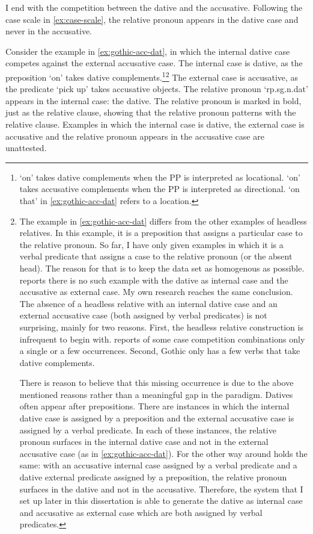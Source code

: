 I end with the competition between the dative and the accusative. Following the case scale in \ref{ex:case-scale}, the relative pronoun appears in the dative case and never in the accusative.

Consider the example in \ref{ex:gothic-acc-dat}, in which the internal dative case competes against the external accusative case.
The internal case is dative, as the preposition  `on' takes dative complements.\footnote{
 `on' takes dative complements when the PP is interpreted as locational.  `on' takes accusative complements when the PP is interpreted as directional.  `on that' in \ref{ex:gothic-acc-dat} refers to a location.
}\footnote{
The example in \ref{ex:gothic-acc-dat} differs from the other examples of headless relatives. In this example, it is a preposition that assigns a particular case to the relative pronoun. So far, I have only given examples in which it is a verbal predicate that assigns a case to the relative pronoun (or the absent head). The reason for that is to keep the data set as homogenous as possible. \citet{harbert1978} reports there is no such example with the dative as internal case and the accusative as external case. My own research reaches the same conclusion. The absence of a headless relative with an internal dative case and an external accusative case (both assigned by verbal predicates) is not surprising, mainly for two reasons. First, the headless relative construction is infrequent to begin with. \citeauthor{harbert1978} reports of some case competition combinations only a single or a few occurrences.
Second, Gothic only has a few verbs that take dative complements.

There is reason to believe that this missing occurrence is due to the above mentioned reasons rather than a meaningful gap in the paradigm. Datives often appear after prepositions. There are instances in which the internal dative case is assigned by a preposition and the external accusative case is assigned by a verbal predicate. In each of these instances, the relative pronoun surfaces in the internal dative case and not in the external accusative case (as in \ref{ex:gothic-acc-dat}). For the other way around holds the same: with an accusative internal case assigned by a verbal predicate and a dative external predicate assigned by a preposition, the relative pronoun surfaces in the dative and not in the accusative. Therefore, the system that I set up later in this dissertation is able to generate the dative as internal case and accusative as external case which are both assigned by verbal predicates.
}
The external case is accusative, as the predicate  `pick up' takes accusative objects.
The relative pronoun  `\ac{rp}.\ac{sg}.\ac{n}.\ac{dat}' appears in the internal case: the dative. The relative pronoun is marked in bold, just as the relative clause, showing that the relative pronoun patterns with the relative clause.
Examples in which the internal case is dative, the external case is accusative and the relative pronoun appears in the accusative case are unattested.

